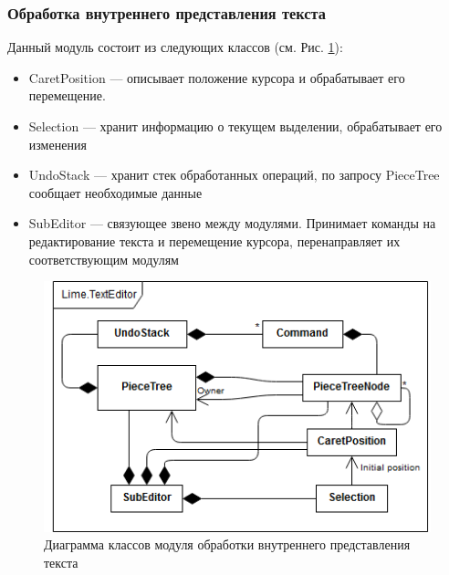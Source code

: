 \documentclass{fefu}
\begin{document}
			\subsubsection{Обработка внутреннего представления текста}
				\par Данный модуль состоит из следующих классов (см. Рис. 
				\ref{diag:SubEditorScheme}):
				\begin{itemize}
					\item CaretPosition --- описывает положение курсора и 
					обрабатывает его перемещение.
					\item Selection --- хранит информацию о текущем выделении, обрабатывает его
					изменения
					\item UndoStack --- хранит стек обработанных операций, по запросу PieceTree 
					сообщает необходимые данные
					\item SubEditor --- связующее звено между модулями. Принимает команды на 
					редактирование текста и перемещение курсора, перенаправляет их
					соответствующим модулям
				\end{itemize}
				\begin{figure}[h]
					\centering
					\includegraphics[width=1\linewidth]{diagrams/SubEditorScheme.png}
					\caption{Диаграмма классов модуля обработки внутреннего 
					представления текста}
					\label{diag:SubEditorScheme}
				\end{figure}
\end{document}
